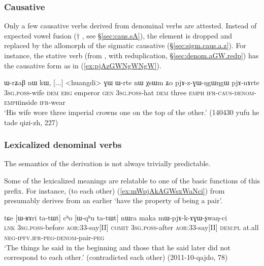 \subsubsection{Causative}  \label{sec:denom.aGW.caus}
Only a few causative verbs derived from  denominal verbs are attested. Instead of expected vowel fusion ($\dagger$ \fl{} , see §\ref{sec:caus.sA}), the  element is dropped and replaced by the  allomorph of the sigmatic causative (§\ref{sec:sigm.caus.a.z}). For instance, the stative verb  (from , with reduplication, §\ref{sec:denom.aGW.redp}) has the causative form   as in (\ref{ex:pjAzGWNgWNgW}).

\begin{exe}
\ex \label{ex:pjAzGWNgWNgW}
\gll ɯ-rʑaβ nɯ kɯ, [...] <huangdi> ɣɯ ɯ-rte nɯ χsɯm ʑo pjɤ-z-ɣɯ-ŋgɯ\redp{}ŋgɯ pjɤ-nɤrte  \\
\textsc{3sg}.\textsc{poss}-wife \textsc{dem} \textsc{erg} { } emperor \textsc{gen} \textsc{3sg}.\textsc{poss}-hat \textsc{dem} three \textsc{emph} \textsc{ifr}-\textsc{caus}-\textsc{denom}-\textsc{emph}\redp{}inside \textsc{ifr}-wear \\
\glt `His wife wore three imperial crowns one on the top of the other.' (140430 yufu he tade qizi-zh, 227)
 \end{exe}
 
 \subsubsection{Lexicalized denominal verbs}  \label{sec:denom.aGW.lexicalized}
The semantics of the  derivation is not always trivially predictable.

Some of the lexicalized meanings are relatable to one of the basic functions of this prefix. For instance,  (to each other) (\ref{ex:mWpjAkAGWsxWaNci}) from  presumably derives from an earlier `have the property of being a pair'.

\begin{exe}
\ex \label{ex:mWpjAkAGWsxWaNci}
\gll tɕe [ɯ-ʁɤri ta-tɯt] cʰo [ɯ-qʰu ta-tɯt] nɯra maka mɯ-pjɤ-k-ɤɣɯ-ʂwaŋ-ci \\
\textsc{lnk} \textsc{3sg}.\textsc{poss}-before \textsc{aor}:3\fl{}3-say[II] \textsc{comit} \textsc{3sg}.\textsc{poss}-after  \textsc{aor}:3\fl{}3-say[II] \textsc{dem}:\textsc{pl} at.all \textsc{neg}-\textsc{ipfv}.\textsc{ifr}-\textsc{peg}-\textsc{denom}-pair-\textsc{peg} \\
\glt `The things he said in the beginning and those that he said later did not correspond to each other.' (contradicted each other) (2011-10-qajdo, 78)
\end{exe}

